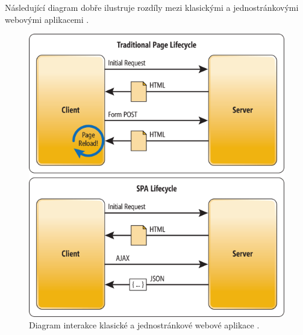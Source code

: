 \pagebreak
Následující diagram dobře ilustruje rozdíly mezi klasickými a jednostránkovými webovými aplikacemi \cite{spa_diagram}.
\begin{figure}[h]
\begin{centering}
\includegraphics[scale=0.5]{obrazky/spa_vs_traditional}
\par\end{centering}
\caption{Diagram interakce klasické a jednostránkové webové aplikace \cite{spa_diagram}. \label{fig:spa_diagram}}
\end{figure}
\FloatBarrier

